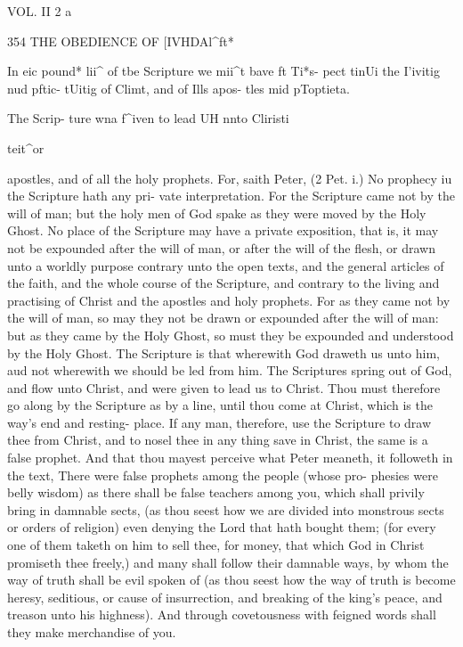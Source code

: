 \documentclass{custom}
\begin{document}
{VOL. II 2 a 


354 
THE OBEDIENCE OF 
[IVHDAl^ft* 

In eic pound* 
lii^ of tbe 
Scripture 
we mii^t 
bave ft Ti*s- 
pect tinUi 
the I'ivitig 
nud pftic- 
tUitig of 
Climt, and 
of Ills apos- 
tles mid 
pToptieta. 

The Scrip- 
ture wna 
f^iven to 
lead UH 
nnto 
Cliristi 

teit^or 

apostles, and of all the holy prophets. For, saith Peter, 
(2 Pet. i.) No prophecy iu the Scripture hath any pri- 
vate interpretation. For the Scripture came not by the will 
of man; but the holy men of God spake as they were 
moved by the Holy Ghost. No place of the Scripture may 
have a private exposition, that is, it may not be expounded 
after the will of man, or after the will of the flesh, or drawn 
unto a worldly purpose contrary unto the open texts, and 
the general articles of the faith, and the whole course of the 
Scripture, and contrary to the living and practising of 
Christ and the apostles and holy prophets. For as they 
came not by the will of man, so may they not be drawn or 
expounded after the will of man: but as they came by the 
Holy Ghost, so must they be expounded and understood by 
the Holy Ghost. The Scripture is that wherewith God 
draweth us unto him, aud not wherewith we should be led 
from him. The Scriptures spring out of God, and flow 
unto Christ, and were given to lead us to Christ. Thou 
must therefore go along by the Scripture as by a line, until 
thou come at Christ, which is the way's end and resting- 
place. If any man, therefore, use the Scripture to draw 
thee from Christ, and to nosel thee in any thing save in 
Christ, the same is a false prophet. And that thou mayest 
perceive what Peter meaneth, it followeth in the text, 
There were false prophets among the people (whose pro- 
phesies were belly wisdom) as there shall be false teachers 
among you, which shall privily bring in damnable sects, 
(as thou seest how we are divided into monstrous sects or 
orders of religion) even denying the Lord that hath 
bought them; (for every one of them taketh on him to 
sell thee, for money, that which God in Christ promiseth 
thee freely,) and many shall follow their damnable ways, 
by whom the way of truth shall be evil spoken of (as thou 
seest how the way of truth is become heresy, seditious, or 
cause of insurrection, and breaking of the king's peace, 
and treason unto his highness). And through covetousness 
with feigned words shall they make merchandise of you. 


}
\end{document}
